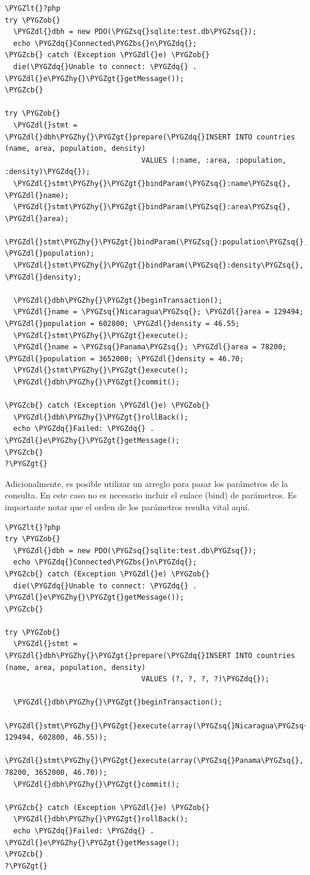 \documentclass[a5paper,10pt,spanish]{sphinxmanual}
\def\PYGZbs{\char`\\}
\def\PYGZob{\char`\{}
\def\PYGZcb{\char`\}}
\def\PYGZlt{\char`\<}
\def\PYGZgt{\char`\>}
\def\PYGZdl{\char`\$}
\def\PYGZhy{\char`\-}
\def\PYGZsq{\char`\'}
\def\PYGZdq{\char`\"}
\begin{document}
\begin{Verbatim}[commandchars=\\\{\}]
\PYGZlt{}?php
try \PYGZob{}
  \PYGZdl{}dbh = new PDO(\PYGZsq{}sqlite:test.db\PYGZsq{});
  echo \PYGZdq{}Connected\PYGZbs{}n\PYGZdq{};
\PYGZcb{} catch (Exception \PYGZdl{}e) \PYGZob{}
  die(\PYGZdq{}Unable to connect: \PYGZdq{} . \PYGZdl{}e\PYGZhy{}\PYGZgt{}getMessage());
\PYGZcb{}

try \PYGZob{}
  \PYGZdl{}stmt = \PYGZdl{}dbh\PYGZhy{}\PYGZgt{}prepare(\PYGZdq{}INSERT INTO countries (name, area, population, density)
                                VALUES (:name, :area, :population, :density)\PYGZdq{});
  \PYGZdl{}stmt\PYGZhy{}\PYGZgt{}bindParam(\PYGZsq{}:name\PYGZsq{}, \PYGZdl{}name);
  \PYGZdl{}stmt\PYGZhy{}\PYGZgt{}bindParam(\PYGZsq{}:area\PYGZsq{}, \PYGZdl{}area);
  \PYGZdl{}stmt\PYGZhy{}\PYGZgt{}bindParam(\PYGZsq{}:population\PYGZsq{}, \PYGZdl{}population);
  \PYGZdl{}stmt\PYGZhy{}\PYGZgt{}bindParam(\PYGZsq{}:density\PYGZsq{}, \PYGZdl{}density);

  \PYGZdl{}dbh\PYGZhy{}\PYGZgt{}beginTransaction();
  \PYGZdl{}name = \PYGZsq{}Nicaragua\PYGZsq{}; \PYGZdl{}area = 129494; \PYGZdl{}population = 602800; \PYGZdl{}density = 46.55;
  \PYGZdl{}stmt\PYGZhy{}\PYGZgt{}execute();
  \PYGZdl{}name = \PYGZsq{}Panama\PYGZsq{}; \PYGZdl{}area = 78200; \PYGZdl{}population = 3652000; \PYGZdl{}density = 46.70;
  \PYGZdl{}stmt\PYGZhy{}\PYGZgt{}execute();
  \PYGZdl{}dbh\PYGZhy{}\PYGZgt{}commit();

\PYGZcb{} catch (Exception \PYGZdl{}e) \PYGZob{}
  \PYGZdl{}dbh\PYGZhy{}\PYGZgt{}rollBack();
  echo \PYGZdq{}Failed: \PYGZdq{} . \PYGZdl{}e\PYGZhy{}\PYGZgt{}getMessage();
\PYGZcb{}
?\PYGZgt{}
\end{Verbatim}

Adicionalmente, es posible utilizar un arreglo para pasar los parámetros
de la consulta. En este caso no es necesario incluir el enlace (bind) de
parámetros. Es importante notar que el orden de los parámetros resulta
vital aquí.

\begin{Verbatim}[commandchars=\\\{\}]
\PYGZlt{}?php
try \PYGZob{}
  \PYGZdl{}dbh = new PDO(\PYGZsq{}sqlite:test.db\PYGZsq{});
  echo \PYGZdq{}Connected\PYGZbs{}n\PYGZdq{};
\PYGZcb{} catch (Exception \PYGZdl{}e) \PYGZob{}
  die(\PYGZdq{}Unable to connect: \PYGZdq{} . \PYGZdl{}e\PYGZhy{}\PYGZgt{}getMessage());
\PYGZcb{}

try \PYGZob{}
  \PYGZdl{}stmt = \PYGZdl{}dbh\PYGZhy{}\PYGZgt{}prepare(\PYGZdq{}INSERT INTO countries (name, area, population, density)
                                VALUES (?, ?, ?, ?)\PYGZdq{});

  \PYGZdl{}dbh\PYGZhy{}\PYGZgt{}beginTransaction();
  \PYGZdl{}stmt\PYGZhy{}\PYGZgt{}execute(array(\PYGZsq{}Nicaragua\PYGZsq{}, 129494, 602800, 46.55));
  \PYGZdl{}stmt\PYGZhy{}\PYGZgt{}execute(array(\PYGZsq{}Panama\PYGZsq{}, 78200, 3652000, 46.70));
  \PYGZdl{}dbh\PYGZhy{}\PYGZgt{}commit();

\PYGZcb{} catch (Exception \PYGZdl{}e) \PYGZob{}
  \PYGZdl{}dbh\PYGZhy{}\PYGZgt{}rollBack();
  echo \PYGZdq{}Failed: \PYGZdq{} . \PYGZdl{}e\PYGZhy{}\PYGZgt{}getMessage();
\PYGZcb{}
?\PYGZgt{}
\end{Verbatim}
\end{document}
